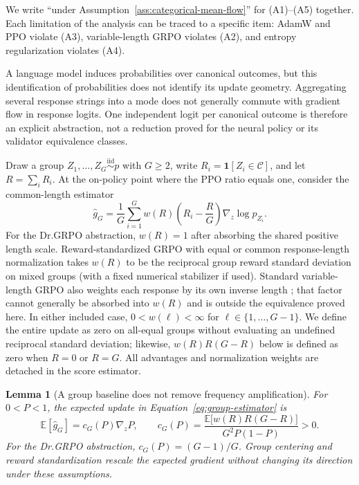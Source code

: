 \documentclass{article}
\newcommand{\1}{\mathbf 1}
\newcommand{\E}{\mathbb E}
\newtheorem{lemma}{Lemma}[section]
\theoremstyle{remark}
\theoremstyle{definition}
\theoremstyle{plain}
\begin{document}
We write ``under Assumption~\ref{ass:categorical-mean-flow}'' for (A1)--(A5)
together. Each limitation of the analysis can be traced to a specific item:
AdamW and PPO violate (A3), variable-length GRPO violates (A2), and entropy
regularization violates (A4).

A language model induces probabilities over canonical outcomes, but this
identification of probabilities does not identify its update geometry.
Aggregating several response strings into a mode does not generally commute
with gradient flow in response logits. One independent logit per canonical
outcome is therefore an explicit abstraction, not a reduction proved for the
neural policy or its validator equivalence classes.

Draw a group $Z_1,\ldots,Z_G\stackrel{\mathrm{iid}}{\sim}p$ with $G\ge2$,
write $R_i=\1[Z_i\in\mathcal C]$, and let $R=\sum_iR_i$. At the on-policy
point where the PPO ratio equals one, consider the common-length estimator
\begin{equation}
  \widehat g_G
  =\frac1G\sum_{i=1}^G
   w(R)\left(R_i-\frac{R}{G}\right)\nabla_z\log p_{Z_i}.
  \label{eq:group-estimator}
\end{equation}
For the Dr.GRPO abstraction, $w(R)=1$ after absorbing the shared positive
length scale. Reward-standardized GRPO with equal or common response-length
normalization takes $w(R)$ to be the reciprocal group reward standard
deviation on mixed groups (with a fixed numerical stabilizer if used).
Standard variable-length GRPO also weights each response by its own inverse
length \citep{shao2024deepseekmath,liu2025understanding}; that factor cannot
generally be absorbed into $w(R)$ and is outside the equivalence proved here.
In either included case, $0<w(\ell)<\infty$ for
$\ell\in\{1,\ldots,G-1\}$. We define the entire update as zero on all-equal
groups without evaluating an undefined reciprocal standard deviation;
likewise, $w(R)R(G-R)$ below is defined as zero when $R=0$ or $R=G$. All
advantages and normalization weights are detached in the score estimator.

\begin{lemma}[A group baseline does not remove frequency amplification]
\label{lem:grpo-mean}
For $0<P<1$, the expected update in Equation~\eqref{eq:group-estimator} is
\begin{equation}
  \E[\widehat g_G]
  =c_G(P)\nabla_z P,
  \qquad
  c_G(P)=
  \frac{\E\!\big[w(R)R(G-R)\big]}{G^2P(1-P)}>0.
  \label{eq:expected-group-gradient}
\end{equation}
For the Dr.GRPO abstraction, $c_G(P)=(G-1)/G$. Group centering and reward
standardization rescale the expected gradient without changing its direction
under these assumptions.
\end{lemma}
\end{document}
